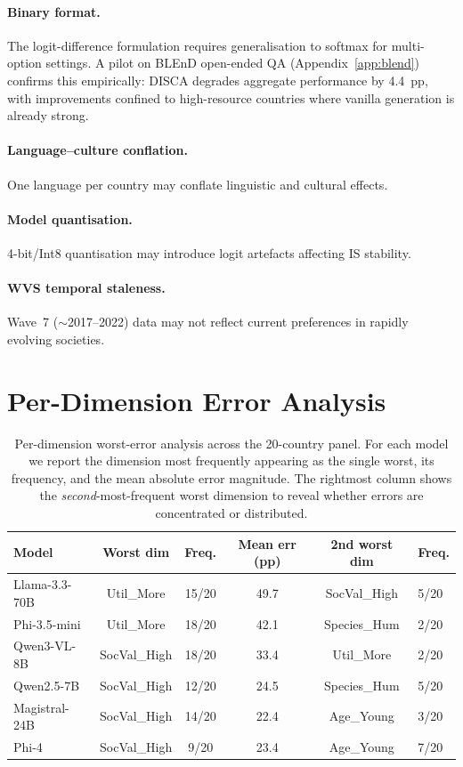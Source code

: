\documentclass{article}
\begin{document}
\paragraph{Binary format.}
The logit-difference formulation requires generalisation to softmax for multi-option
settings. A pilot on BLEnD open-ended QA (Appendix~\ref{app:blend}) confirms this
empirically: DISCA degrades aggregate performance by 4.4~pp, with improvements
confined to high-resource countries where vanilla generation is already strong.

\paragraph{Language--culture conflation.}
One language per country may conflate linguistic and cultural effects.

\paragraph{Model quantisation.}
4-bit/Int8 quantisation may introduce logit artefacts affecting IS stability.

\paragraph{WVS temporal staleness.}
Wave~7 ($\sim$2017--2022) data may not reflect current preferences in rapidly
evolving societies.


\section{Per-Dimension Error Analysis}
\label{app:perdim}

\begin{table}[h]\centering\scriptsize
\caption{Per-dimension worst-error analysis across the 20-country panel.
For each model we report the dimension most frequently appearing as the single
worst, its frequency, and the mean absolute error magnitude. The rightmost
column shows the \emph{second}-most-frequent worst dimension to reveal whether
errors are concentrated or distributed.}
\label{tab:perdim_summary}
\setlength{\tabcolsep}{3pt}
\begin{tabular}{lccccl}\toprule
Model & Worst dim & Freq. & Mean err (pp) & 2nd worst dim & Freq. \\\midrule
Llama-3.3-70B   & Util\_More    & 15/20 & 49.7 & SocVal\_High & 5/20 \\
Phi-3.5-mini    & Util\_More    & 18/20 & 42.1 & Species\_Hum & 2/20 \\
Qwen3-VL-8B     & SocVal\_High  & 18/20 & 33.4 & Util\_More   & 2/20 \\
Qwen2.5-7B      & SocVal\_High  & 12/20 & 24.5 & Species\_Hum & 5/20 \\
Magistral-24B   & SocVal\_High  & 14/20 & 22.4 & Age\_Young   & 3/20 \\
Phi-4           & SocVal\_High  &  9/20 & 23.4 & Age\_Young   & 7/20 \\
\bottomrule
\end{tabular}
\end{table}
\end{document}
